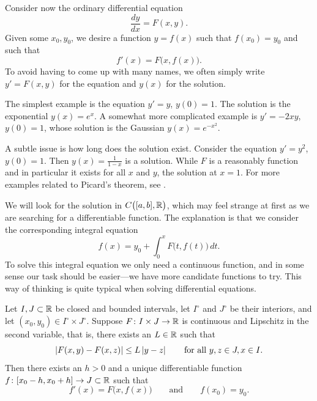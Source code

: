 \medskip

Consider now the ordinary differential equation
\begin{equation*}
\frac{dy}{dx} = F(x,y) .
\end{equation*}
Given some $x_0, y_0$, we desire a function $y=f(x)$ such that
$f(x_0) = y_0$ and such that
\begin{equation*}
f'(x) = F\bigl(x,f(x)\bigr) .
\end{equation*}
To avoid having to come up with many names, we often simply write $y' = F(x,y)$
for the equation
and $y(x)$ for the solution.

The simplest example is the equation $y' = y$, $y(0) = 1$.
The solution is the exponential $y(x) = e^x$.  A somewhat more complicated
example is $y' = -2xy$, $y(0) = 1$, whose solution is the Gaussian
$y(x) = e^{-x^2}$.

A subtle issue is how long does the solution exist.
Consider the equation $y' = y^2$, $y(0)=1$.  Then $y(x) = \frac{1}{1-x}$ is a
solution.  While $F$ is a reasonably  function and in particular
it exists for all $x$ and $y$, the solution  at $x=1$.
For more examples related to Picard's theorem, see .

We will look for the solution in 
$C\bigl([a,b],{\mathbb{R}}\bigr)$, which may feel strange at first as
we are searching for a differentiable function.
The explanation is that we consider the
corresponding integral equation
\begin{equation*}
f(x)
=
y_0 + \int_0^x F\bigl(t,f(t)\bigr)\,dt .
\end{equation*}
To solve this integral equation we only need a continuous function, and
in some sense our task should be easier---we have more candidate functions
to try.  This way of thinking is quite typical when solving differential
equations.

\begin{samepage}
\begin{thm}%
Let $I, J \subset {\mathbb{R}}$ be closed and bounded intervals,
let $I^\circ$ and $J^\circ$ be their interiors, and 
let $(x_0,y_0) \in I^\circ \times J^\circ$.
Suppose $F \colon I \times J \to {\mathbb{R}}$ is continuous
and Lipschitz in the second variable, that is, there exists
an $L \in {\mathbb{R}}$ such that
\begin{equation*}
\left\lvert {F(x,y) - F(x,z)} \right\rvert \leq L \left\lvert {y-z} \right\rvert
\qquad \text{for all } y,z \in J, x \in I .
\end{equation*}
Then there exists an $h > 0$ and a unique differentiable
function $f \colon [x_0 - h, x_0 + h] \to J \subset {\mathbb{R}}$ such that
\begin{equation*}
f'(x) = F\bigl(x,f(x)\bigr) \qquad \text{and} \qquad f(x_0) = y_0.
\end{equation*}
\end{thm}
\end{samepage}

